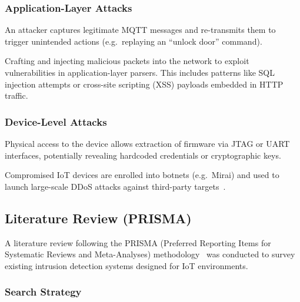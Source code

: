 \documentclass[12pt,a4paper]{article}
\begin{document}
\subsubsection*{Application-Layer Attacks}

\begin{description}[style=nextline]
    \item[Replay Attacks]
    An attacker captures legitimate MQTT messages and re-transmits them to trigger unintended actions (e.g.\ replaying an ``unlock door'' command).

    \item[Packet Injection]
    Crafting and injecting malicious packets into the network to exploit vulnerabilities in application-layer parsers. This includes patterns like SQL injection attempts or cross-site scripting (XSS) payloads embedded in HTTP traffic.
\end{description}

\subsubsection*{Device-Level Attacks}

\begin{description}[style=nextline]
    \item[Firmware Extraction and Reverse Engineering]
    Physical access to the device allows extraction of firmware via JTAG or UART interfaces, potentially revealing hardcoded credentials or cryptographic keys.

    \item[Botnet Recruitment]
    Compromised IoT devices are enrolled into botnets (e.g.\ Mirai) and used to launch large-scale DDoS attacks against third-party targets~\cite{antonakakis2017mirai}.
\end{description}

\subsection{Literature Review (PRISMA)}
\label{sec:prisma}

A literature review following the PRISMA (Preferred Reporting Items for Systematic Reviews and Meta-Analyses) methodology~\cite{page2021prisma} was conducted to survey existing intrusion detection systems designed for IoT environments.

\subsubsection*{Search Strategy}
\end{document}
